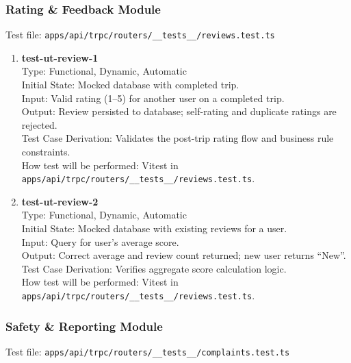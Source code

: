 \documentclass[12pt, titlepage]{article}
\begin{document}
\subsubsection{Rating \& Feedback Module}

Test file: \texttt{apps/api/trpc/routers/\_\_tests\_\_/reviews.test.ts}

\begin{enumerate}
\item \textbf{test-ut-review-1}\\
Type: Functional, Dynamic, Automatic\\
Initial State: Mocked database with completed trip.\\
Input: Valid rating (1--5) for another user on a completed trip.\\
Output: Review persisted to database; self-rating and duplicate ratings are rejected.\\
Test Case Derivation: Validates the post-trip rating flow and business rule constraints.\\
How test will be performed: Vitest in \texttt{apps/api/trpc/routers/\_\_tests\_\_/reviews.test.ts}.\\

\item \textbf{test-ut-review-2}\\
Type: Functional, Dynamic, Automatic\\
Initial State: Mocked database with existing reviews for a user.\\
Input: Query for user's average score.\\
Output: Correct average and review count returned; new user returns ``New''.\\
Test Case Derivation: Verifies aggregate score calculation logic.\\
How test will be performed: Vitest in \texttt{apps/api/trpc/routers/\_\_tests\_\_/reviews.test.ts}.\\
\end{enumerate}

\subsubsection{Safety \& Reporting Module}

Test file: \texttt{apps/api/trpc/routers/\_\_tests\_\_/complaints.test.ts}
\end{document}
